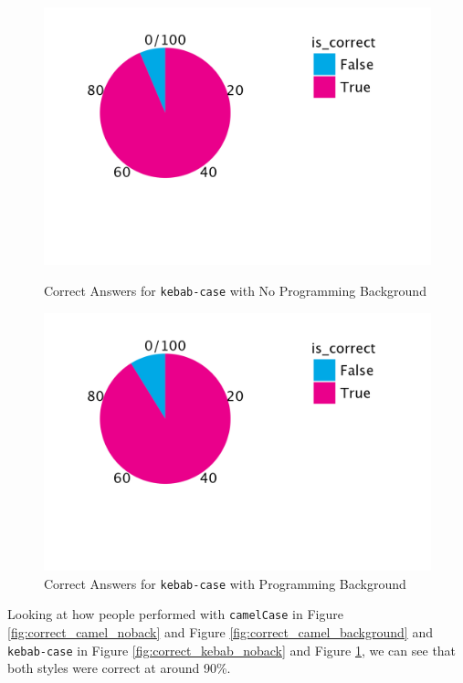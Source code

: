 \documentclass[unicode,11pt,a4paper,oneside,numbers=endperiod,openany]{scrartcl}
\begin{document}
\begin{figure}[h!]
    \begin{minipage}{0.45\textwidth}
        \centering
        \includegraphics[width=\textwidth]{./figures/correct_kebab_noBack.png}
        \caption{Correct Answers for \texttt{kebab-case} with No Programming Background}
        \label{fig:correct_kebab_noback}
    \end{minipage}
    \hfill
    \begin{minipage}{0.45\textwidth}
        \centering
        \includegraphics[width=\textwidth]{./figures/correct_keb_backgr.png}
        \caption{Correct Answers for \texttt{kebab-case} with Programming Background}
        \label{fig:correct_kebab_background}
    \end{minipage}
\end{figure}

Looking at how people performed with \texttt{camelCase} in Figure \ref{fig:correct_camel_noback} and Figure \ref{fig:correct_camel_background} and \texttt{kebab-case} in Figure \ref{fig:correct_kebab_noback} and Figure \ref{fig:correct_kebab_background}, we can see that both styles were correct at around 90\%. \\
\end{document}
